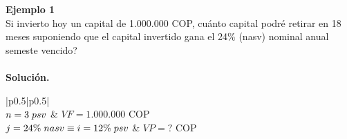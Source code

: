 \textbf{Ejemplo 1}\\
Si invierto hoy un capital de 1.000.000 COP, cuánto capital podré retirar en 18 meses suponiendo que el capital invertido gana el 24\% (nasv) nominal anual semeste vencido? \\ \\
\textbf{Solución.}\\
\begin{center}
 \renewcommand{\arraystretch}{1.5}%
 \begin{longtable}[H]{|p{0.5\linewidth}|p{0.5\linewidth}|}
  \hline
                    \\ \hline
  $n = 3 \hspace{1mm} psv$                                      & $VF =  1{.}000{.}000$ COP             \\
  $j = 24\% \hspace{1mm} nasv \equiv i = 12\% \hspace{1mm} psv$ & $VP =  ?$ COP                       \\ \hline
                      \\ \hline
                                                                                                     \\ \hline
                         \\ \hline
                                                       \\

\end{longtable}
\end{center}
